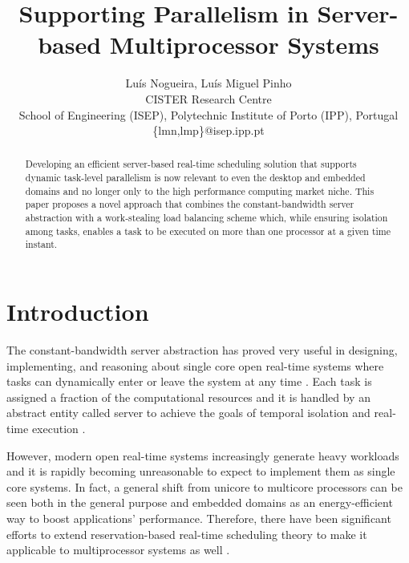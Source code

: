 \documentclass[10pt,twocolumn]{article}
\begin{document}
\title{Supporting Parallelism in Server-based Multiprocessor Systems}

\author{Luís Nogueira, Luís Miguel Pinho\\
CISTER Research Centre\\
School of Engineering (ISEP), Polytechnic Institute of Porto (IPP), Portugal\\
\{lmn,lmp\}@isep.ipp.pt}

\maketitle

\begin{abstract}
Developing an efficient server-based real-time scheduling solution that supports dynamic task-level parallelism is now relevant to even the desktop and embedded domains and no longer only to the high performance computing market niche. This paper proposes a novel approach that combines the constant-bandwidth server abstraction with a work-stealing load balancing scheme which, while ensuring isolation among tasks, enables a task to be executed on more than one processor at a given time instant. 
\end{abstract}


\section{Introduction}

The constant-bandwidth server abstraction has proved very useful in designing, implementing, and reasoning about single core open real-time systems where tasks can dynamically enter or leave the system at any time \cite{luisJSA10}. Each task is assigned a fraction of the computational resources and it is handled by an abstract entity called server to achieve the goals of temporal isolation and real-time execution \cite{abeni98}.

However, modern open real-time systems increasingly generate heavy workloads and it is rapidly becoming unreasonable to expect to implement them as single core systems. In fact, a general shift from unicore to multicore processors can be seen both in the general purpose and embedded domains as an energy-efficient way to boost applications' performance. Therefore, there have been significant efforts to extend reservation-based real-time scheduling theory to make it applicable to multiprocessor systems as well \cite{baruah02,pellizzoni08,faggioli10,kato10}. 
\end{document}
